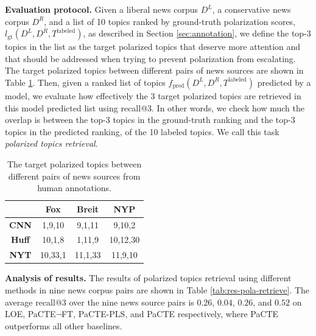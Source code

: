 \documentclass[11pt]{article}
\begin{document}
\textbf{Evaluation protocol.} Given a liberal news corpus $D^L$, a conservative news corpus $D^R$, and a list of 10 topics ranked by ground-truth polarization scores, $l_{\text{gt}}(D^L, D^R, T^{\text{labeled}})$, as described in Section \ref{sec:annotation}, we define the top-3 topics in the list as the target polarized topics
that deserve more attention and that should be addressed when trying to prevent polarization from escalating. The target polarized topics between different pairs of news sources are shown in Table \ref{tab:pola-topics}.
Then, given a ranked list of topics $f_{\text{pred}}(D^L, D^R, T^{\text{labeled}})$ predicted by a model, we evaluate how 
effectively the 3 target polarized topics are retrieved in this model predicted list
using recall@3. %
In other words, we check how much the overlap is between the top-3 topics in the ground-truth ranking and the top-3 topics in the predicted ranking, of the 10 labeled topics. We call this task \emph{polarized topics retrieval}. 

\begin{table}[ht]
\centering
\small
\begin{tabular}{c|ccc}
\hline
              & \textbf{Fox} & \textbf{Breit} & \textbf{NYP} \\ \hline
\textbf{CNN}  & 1,9,10        & 9,1,11          & 9,10,2        \\
\textbf{Huff} & 10,1,8     & 1,11,9       & 10,12,30     \\
\textbf{NYT}  & 10,33,1     & 11,1,33       & 11,9,10    \\ \hline
\end{tabular}
\caption{The target polarized topics between different pairs of news sources from human annotations.}
\label{tab:pola-topics}
\end{table}


\textbf{Analysis of results.} The results of polarized topics retrieval using different methods in nine news corpus pairs are shown in Table \ref{tab:res-pola-retrieve}. The average recall@3 over the nine news source pairs is $0.26$, $0.04$, $0.26$, and $0.52$ on LOE, PaCTE$\neg$FT, PaCTE-PLS, and PaCTE respectively, where PaCTE outperforms all other baselines. 
\end{document}
